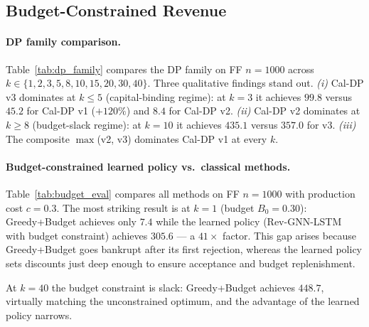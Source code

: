 \subsection{Budget-Constrained Revenue}
\label{sec:exp_budget}

\paragraph{DP family comparison.}
Table~\ref{tab:dp_family} compares the DP family on FF $n{=}1000$ across
$k \in \{1, 2, 3, 5, 8, 10, 15, 20, 30, 40\}$.
Three qualitative findings stand out.
\emph{(i)} Cal-DP v3 dominates at $k \le 5$ (capital-binding regime):
at $k{=}3$ it achieves $99.8$ versus $45.2$ for Cal-DP v1 ($+120\%$)
and $8.4$ for Cal-DP v2. %
\emph{(ii)} Cal-DP v2 dominates at $k \ge 8$ (budget-slack regime):
at $k{=}10$ it achieves $435.1$ versus $357.0$ for v3. %
\emph{(iii)} The composite $\max$(v2, v3) dominates Cal-DP v1 at every $k$.



\paragraph{Budget-constrained learned policy vs.\ classical methods.}
Table~\ref{tab:budget_eval} compares all methods on FF $n{=}1000$
with production cost $c{=}0.3$.
The most striking result is at $k{=}1$ (budget $B_0{=}0.30$):
Greedy+Budget achieves only $7.4$ %
while the learned policy (Rev-GNN-LSTM with budget constraint) achieves $305.6$ %
— a $41{\times}$ factor.
This gap arises because Greedy+Budget goes bankrupt after its first rejection,
whereas the learned policy sets discounts just deep enough to ensure acceptance
and budget replenishment.

At $k{=}40$ the budget constraint is slack: Greedy+Budget achieves $448.7$, %
virtually matching the unconstrained optimum, and the advantage of the learned
policy narrows.

